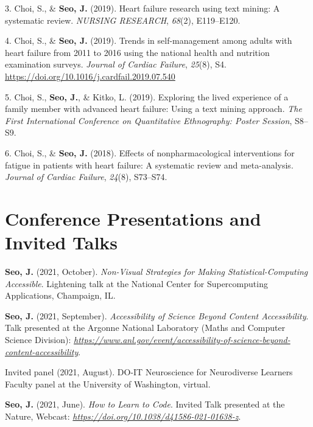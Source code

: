 \documentclass[11pt,a4paper,]{awesome-cv}
\begin{document}
\leavevmode{}%
3. Choi, S., \& \textbf{Seo, J.} (2019). Heart failure research using
text mining: A systematic review. \emph{NURSING RESEARCH}, \emph{68}(2),
E119--E120.

\leavevmode{}%
4. Choi, S., \& \textbf{Seo, J.} (2019). Trends in self-management among
adults with heart failure from 2011 to 2016 using the national health
and nutrition examination surveys. \emph{Journal of Cardiac Failure},
\emph{25}(8), S4. \url{https://doi.org/10.1016/j.cardfail.2019.07.540}

\leavevmode{}%
5. Choi, S., \textbf{Seo, J.}, \& Kitko, L. (2019). Exploring the lived
experience of a family member with advanced heart failure: Using a text
mining approach. \emph{The First International Conference on
Quantitative Ethnography: Poster Session}, S8--S9.

\leavevmode{}%
6. Choi, S., \& \textbf{Seo, J.} (2018). Effects of nonpharmacological
interventions for fatigue in patients with heart failure: A systematic
review and meta-analysis. \emph{Journal of Cardiac Failure},
\emph{24}(8), S73--S74.

\hypertarget{conference-presentations-and-invited-talks}{%
\section{Conference Presentations and Invited
Talks}\label{conference-presentations-and-invited-talks}}

\textbf{Seo, J.} (2021, October). \emph{Non-Visual Strategies for Making
Statistical-Computing Accessible}. Lightening talk at the National
Center for Supercomputing Applications, Champaign, IL.

\textbf{Seo, J.} (2021, September). \emph{Accessibility of Science
Beyond Content Accessibility}. Talk presented at the Argonne National
Laboratory (Maths and Computer Science Division):
\emph{\url{https://www.anl.gov/event/accessibility-of-science-beyond-content-accessibility}}.

Invited panel (2021, August). DO-IT Neuroscience for Neurodiverse
Learners Faculty panel at the University of Washington, virtual.

\textbf{Seo, J.} (2021, June). \emph{How to Learn to Code}. Invited Talk
presented at the Nature, Webcast:
\emph{\url{https://doi.org/10.1038/d41586-021-01638-z}}.
\end{document}
